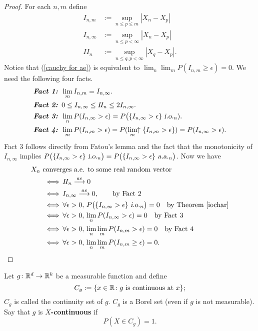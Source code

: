 \begin{proof}
For each $n,m$ define
\begin{align*}
I_{n,m} &:= \sup_{n\leq p\leq m} |X_n-X_p| \\
I_{n,\infty} &:= \sup_{n\leq p< \infty} |X_n-X_p| \\
I\!I_{n} &:= \sup_{n\leq q, p < \infty} |X_q-X_p|.
\end{align*}
Notice that (\ref{cauchy for ae}) is equivalent to $\lim_n\lim_m P(I_{n,m}\geq \epsilon)=0$. We need the following four facts.
\begin{align*}
&\text{\bf \em Fact 1: }\lim_{m} I_{n,m} = I_{n,\infty}. \\
&\text{\bf \em Fact 2: }0\leq I_{n,\infty} \leq I\!I_{n}\leq 2I_{n,\infty}. \\
&\text{\bf \em Fact 3: }\lim_n P(I_{n,\infty} >\epsilon) = P\bigl(\{I_{n,\infty} > \epsilon\} {\,\,\text{\sl i.o.} }_n).\\
&\text{\bf \em Fact 4: }\lim_m P(I_{n,m} >\epsilon) = P(\displaystyle\lim_{m}\!\!\uparrow \{I_{n,m} >\epsilon\}) = P(I_{n,\infty} > \epsilon).
\end{align*}
Fact 3 follows directly from Fatou's lemma and the fact that the monotonicity of $I_{n,\infty}$ implies  $P\bigl(\{I_{n,\infty} > \epsilon\} {\,\,\text{\sl i.o.} }_n\bigr) = P\bigl(\{I_{n,\infty} > \epsilon\} {\,\,\text{\sl a.a.} }_n\bigr)$.  Now we have
\begin{align*}
&\text{$X_n$ converges a.e. to some real random vector } \\
&\qquad \Longleftrightarrow\, I\!I_{n} \overset{\small ae} \longrightarrow 0 \\
&\qquad \Longleftrightarrow\, I_{n,\infty} \overset{\small ae} \longrightarrow 0,\qquad\text{by Fact 2} \\
&\qquad \Longleftrightarrow\,  \forall \epsilon > 0,\, P\bigl(\{I_{n,\infty} >\epsilon\} {\,\,\text{\sl i.o.} }_n\bigr) = 0 \quad\text{by Theorem \ref{iochar}}\\
&\qquad \Longleftrightarrow\, \forall \epsilon > 0,\, \lim_n P(I_{n,\infty} >\epsilon) =0 \quad\text{by Fact 3}\\
&\qquad \Longleftrightarrow\, \forall \epsilon > 0,\,  \lim_n \lim_m P(I_{n,m} >\epsilon) =0 \quad\text{by Fact 4}\\
&\qquad \Longleftrightarrow\, \forall \epsilon > 0,\,  \lim_n \lim_m P(I_{n,m} \geq \epsilon) =0.
\end{align*}
\end{proof}



\begin{definition}
Let $g\colon \Bbb R^d\rightarrow \Bbb R^k$ be a measurable function and define
\[ C_g:=\{ x\in\Bbb R\colon \text{$g$ is continuous at $x$}\}; \]
$C_g$ is called the continuity set of $g$. $C_g$ is a Borel set (even if $g$ is not measurable). Say that $g$ is {\bf $X$-continuous} if
\[  P(X\in C_g)=1. \]
\end{definition}


